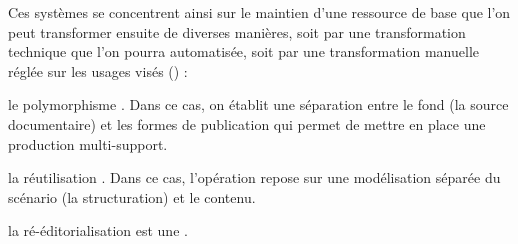 Ces systèmes se concentrent ainsi sur le maintien d'une ressource de base que l'on peut transformer ensuite de diverses manières, soit par une transformation technique que l'on pourra automatisée, soit par une transformation manuelle réglée sur les usages visés (\cite{Crozat2011}) : 
\begin{liste}
	\item le polymorphisme . Dans ce cas, on établit une séparation entre le fond (la source documentaire) et les formes de publication qui permet de mettre en place une production multi-support.

	\item la réutilisation . Dans ce cas, l'opération repose sur une modélisation séparée du scénario (la structuration) et le contenu.

	\item la ré-éditorialisation est une .

\end{liste}

